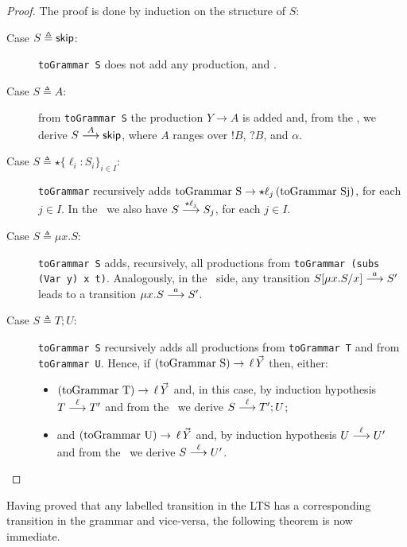\begin{proof}
	The proof is done by induction on the structure of $S$:
	\begin{description}
		\item[Case $S \triangleq \skipk$:] \lstinline{toGrammar S} does not
		     add any production, and .
		\item[Case $S \triangleq A$:] from \lstinline{toGrammar S} the
		     production $Y\rightarrow A$ is added and, from the \LTS, we derive
		     $S \LTSderives[A] \skipk$, where $A$ ranges over $!B$, $?B$,
		     and $\alpha$.
		\item[Case $S\triangleq \star \{\ell_i : S_i\}_{i\in I}$:]
		     \lstinline{toGrammar} recursively adds
		     $\text{\lstinline{toGrammar S}} \rightarrow \star \ell_j\,
		     \text{(\lstinline{toGrammar Sj})}$,
		     for each $j\in I$. In the \LTS\ we also have
		     $S \LTSderives[\star \ell_j] S_j$, for each $j\in I$.
		\item[Case $S\triangleq \mu x.S$:] \lstinline{toGrammar S} adds,
		     recursively, all productions from \linebreak \lstinline{toGrammar (subs (Var y) x t)}.
		     Analogously, in the \LTS\ side, any transition
		     $S[\mu x.S/x] \LTSderives[a] S'$ leads to a transition
		     $\mu x.S \LTSderives[a] S'$.
		\item[Case $S \triangleq T;U$:]   \lstinline{toGrammar S} recursively adds
		     all productions from   \lstinline{toGrammar T} and from
		     \lstinline{toGrammar U}. Hence, if
		     $\text{(\lstinline{toGrammar S})} \rightarrow \, \ell \, \vec Y$ then,
		     either:
		     \begin{itemize}
		     	\item $\text{(\lstinline{toGrammar T}}) \rightarrow \, \ell \, \vec Y$ and,
		     	      in this case, by induction hypothesis $T \LTSderives[\ell] T'$ and
		     	      from the \LTS\ we derive $S \LTSderives[\ell] T';U$;
		     	\item {} and $\text{(\lstinline{toGrammar U}}) \rightarrow \,
		     	      \ell \, \vec Y$ and, by induction hypothesis $U \LTSderives[\ell] U'$
		     	      and from the \LTS\ we derive $S \LTSderives[\ell] U'$.
		     \end{itemize}
	\end{description}
\end{proof}

Having proved that any labelled transition in the LTS has a corresponding
transition in the grammar and vice-versa, the following theorem is now
immediate.

